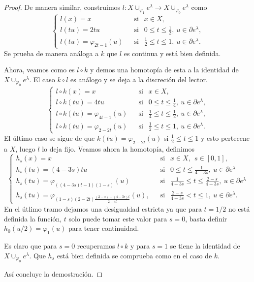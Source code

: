 \begin{proof}
    De manera similar, construimos $l: X\cup_{\varphi_1} e^{\lambda} \to X\cup_{\varphi_0} e^{\lambda}$ como
    \begin{equation*}
        \begin{cases}
            l(x) = x &~~\text{ si }~~ x\in X,\\
            l(tu) = 2tu &~~\text{ si }~~ 0\le t\le \frac{1}{2},~u\in \partial e^{\lambda},\\
            l(tu) = \varphi_{2t-1}(u) &~~\text{ si }~~  \frac{1}{2} \le t\le 1,~u\in \partial e^{\lambda}.
        \end{cases}
    \end{equation*}
    Se prueba de manera análoga a $k$ que $l$ es continua y está bien definida.
    
    Ahora, veamos como es $l\circ k$ y demos una homotopía de esta a la identidad de $X\cup_{\varphi_0} e^{\lambda}$. El caso $k\circ l$ es análogo y se deja a la discreción del lector.
    \begin{equation*}
        \begin{cases}
            l\circ k(x) = x &~~\text{ si }~~ x\in X,\\
            l\circ k(tu) = 4tu &~~\text{ si }~~ 0\le t\le \frac{1}{4},~u\in \partial e^{\lambda},\\
            l\circ k(tu) = \varphi_{4t-1}(u) &~~\text{ si }~~  \frac{1}{4} \le t\le \frac{1}{2},~u\in \partial e^{\lambda},\\
            l\circ k(tu) = \varphi_{2-2t}(u) &~~\text{ si }~~  \frac{1}{2} \le t\le 1,~u\in \partial e^{\lambda}.
        \end{cases}
    \end{equation*}
    El último caso se sigue de que $k(tu) = \varphi_{2-2t}(u)$ si $\frac{1}{2} \le t\le 1$ y esto pertecene a $X$, luego $l$ lo deja fijo. Veamos ahora la homotopía, definimos
    \begin{equation*}
    \begin{cases}
        h_s(x) = x &~~\text{ si }~~ x\in X, ~~s\in[0,1],\\[4pt]
        h_s(tu) = (4-3s)tu &~~\text{ si }~~ 0 \le t \le \frac{1}{4-3s},~u\in \partial e^{\lambda} \\[4pt]
        h_s(tu) = \varphi_{((4-3s)t-1)(1-s)}(u) &~~\text{ si }~~ \frac{1}{4-3s} \le t \le \frac{2-s}{4-3s},~u\in \partial e^{\lambda} \\[4pt]
        h_s(tu) = \varphi_{(1-s)(2-2t)\frac{(2-s)-(4-3s)t}{2-4t}}(u),
        &~~\text{ si }~~  \frac{2-s}{4-3s} < t \le 1,~u\in \partial e^{\lambda}.
    \end{cases}
    \end{equation*}
    En el útlimo tramo dejamos una desigualdad estricta ya que para $t=1/2$ no está definida la función, $t$ solo puede tomar este valor para $s=0$, basta definir $h_0(u/2)=\varphi_1(u)$ para tener continuidad. 
    
    Es claro que para $s=0$ recuperamos $l\circ k$ y para $s=1$ se tiene la identidad de $X\cup_{\varphi_0} e^{\lambda}$. Que $h_s$ está bien definida se comprueba como en el caso de $k$.

    Así concluye la demostración.

\end{proof}
